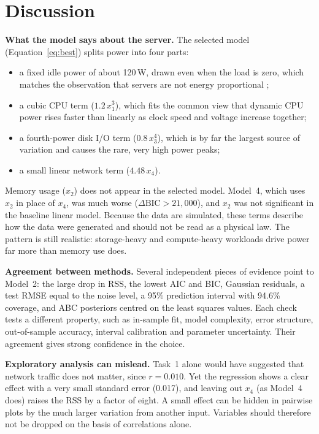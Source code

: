 \section{Discussion}
\label{sec:discussion}

\textbf{What the model says about the server.} The selected model (Equation~\ref{eq:best}) splits power into four parts:
\begin{itemize}
  \item a fixed idle power of about 120\,W, drawn even when the load is zero, which matches the observation that servers are not energy proportional \citep{barroso2007};
  \item a cubic CPU term ($1.2\,x_1^3$), which fits the common view that dynamic CPU power rises faster than linearly as clock speed and voltage increase together;
  \item a fourth-power disk I/O term ($0.8\,x_3^4$), which is by far the largest source of variation and causes the rare, very high power peaks;
  \item a small linear network term ($4.48\,x_4$).
\end{itemize}
Memory usage ($x_2$) does not appear in the selected model. Model~4, which uses $x_2$ in place of $x_4$, was much worse ($\Delta\text{BIC}>21{,}000$), and $x_2$ was not significant in the baseline linear model. Because the data are simulated, these terms describe how the data were generated and should not be read as a physical law. The pattern is still realistic: storage-heavy and compute-heavy workloads drive power far more than memory use does.

\textbf{Agreement between methods.} Several independent pieces of evidence point to Model~2: the large drop in RSS, the lowest AIC and BIC, Gaussian residuals, a test RMSE equal to the noise level, a 95\% prediction interval with 94.6\% coverage, and ABC posteriors centred on the least squares values. Each check tests a different property, such as in-sample fit, model complexity, error structure, out-of-sample accuracy, interval calibration and parameter uncertainty. Their agreement gives strong confidence in the choice.

\textbf{Exploratory analysis can mislead.} Task~1 alone would have suggested that network traffic does not matter, since $r=0.010$. Yet the regression shows a clear effect with a very small standard error (0.017), and leaving out $x_4$ (as Model~4 does) raises the RSS by a factor of eight. A small effect can be hidden in pairwise plots by the much larger variation from another input. Variables should therefore not be dropped on the basis of correlations alone.

